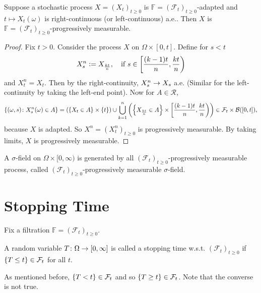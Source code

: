 \begin{prop}
    Suppose a stochastic process $X = (X_t)_{t \geq 0}$ is $\mathbb{F} = (\mathcal{F}_t)_{t \geq 0}$-adapted and $t \mapsto X_t(\omega)$ is right-continuous (or left-continuous) a.e.. Then $X$ is $\mathbb{F} = (\mathcal{F}_t)_{t \geq 0}$-progressively measurable.
\end{prop}
\begin{proof}
    Fix $t > 0$. Consider the process $X$ on $\Omega \times [0,t]$. Define for $s < t$
    \begin{equation*}
        X^n_s \vcentcolon= X_{\frac{kt}{n}},\quad\text{if } s \in \left[\frac{(k-1)t}{n},\frac{kt}{n}\right)
    \end{equation*}
    and $X^n_t = X_t$. Then by the right-continuity, $X^n_s \rightarrow X_s$ a.e. (Similar for the left-continuity by taking the left-end point). Now for $A \in \mathcal{R}$,
    \begin{equation*}
        \left\{(\omega,s)\colon X^n_s(\omega) \in A\right\} = \left(\left\{X_t \in A\right\}\times \left\{t\right\}\right) \cup \bigcup_{k=1}^n\left(\left\{X_{\frac{kt}{n}} \in A\right\} \times \left[\frac{(k-1)t}{n},\frac{kt}{n}\right)\right) \in \mathcal{F}_t \times \mathcal{B}([0,t]),
    \end{equation*}
    because $X$ is adapted. So $X^n = (X^n_t)_{t\geq 0}$ is progressively measurable. By taking limits, $X$ is progressively measurable.
\end{proof}
\begin{rmk}
    A $\sigma$-field on $\Omega \times [0,\infty)$ is generated by all $(\mathcal{F}_t)_{t \geq 0}$-progressively measurable process, called $(\mathcal{F}_t)_{t \geq 0}$-progressively measurable $\sigma$-field.
\end{rmk}

\section{Stopping Time}

Fix a filtration $\mathbb{F} = (\mathcal{F}_t)_{t \geq 0}$.

\begin{defn}
    A random variable $T \colon \Omega \rightarrow [0,\infty]$ is called a stopping time w.s.t. $(\mathcal{F}_t)_{t \geq 0}$ if $\left\{T \leq t\right\} \in \mathcal{F}_t$ for all $t$.
\end{defn}
\begin{rmk}
    As mentioned before, $\left\{T < t\right\} \in \mathcal{F}_t$ and so $\left\{T \geq t\right\} \in \mathcal{F}_t$. Note that the converse is not true.
\end{rmk}

